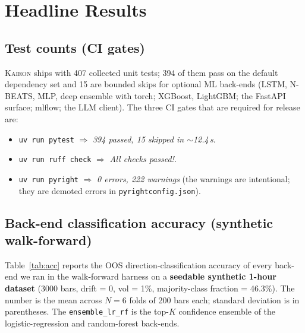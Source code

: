 \documentclass[11pt,a4paper]{article}
\let\oldsection\section
\renewcommand{\section}{\clearpage\oldsection}
\providecommand{\kairon}{\textsc{Kairon}}
\begin{document}
\section{Headline Results}\label{sec:results}

\subsection{Test counts (CI gates)}
\kairon{} ships with 407 collected unit tests; 394 of them
pass on the default dependency set and 15 are bounded skips
for optional ML back-ends (LSTM, N-BEATS, MLP, deep ensemble
with torch; XGBoost, LightGBM; the FastAPI surface; mlflow;
the LLM client). The three CI gates that are required for
release are:
\begin{itemize}[leftmargin=1.2em,itemsep=0.05em,topsep=0.1em]
    \item \texttt{uv run pytest} $\Rightarrow$
    \emph{394 passed, 15 skipped in $\sim$12.4\,s}.
    \item \texttt{uv run ruff check} $\Rightarrow$
    \emph{All checks passed!}.
    \item \texttt{uv run pyright} $\Rightarrow$
    \emph{0 errors, 222 warnings} (the warnings are
    intentional; they are demoted errors in
    \texttt{pyrightconfig.json}).
\end{itemize}

\subsection{Back-end classification accuracy (synthetic walk-forward)}
Table~\ref{tab:acc} reports the OOS direction-classification
accuracy of every back-end we ran in the walk-forward harness
on a \textbf{seedable synthetic 1-hour dataset} (3000 bars,
drift = 0, vol = 1\%, majority-class fraction = 46.3\%).
The number is the mean across $N=6$ folds of 200 bars each;
standard deviation is in parentheses. The
\texttt{ensemble\_lr\_rf} is the top-$K$ confidence ensemble
of the logistic-regression and random-forest back-ends.
\end{document}
